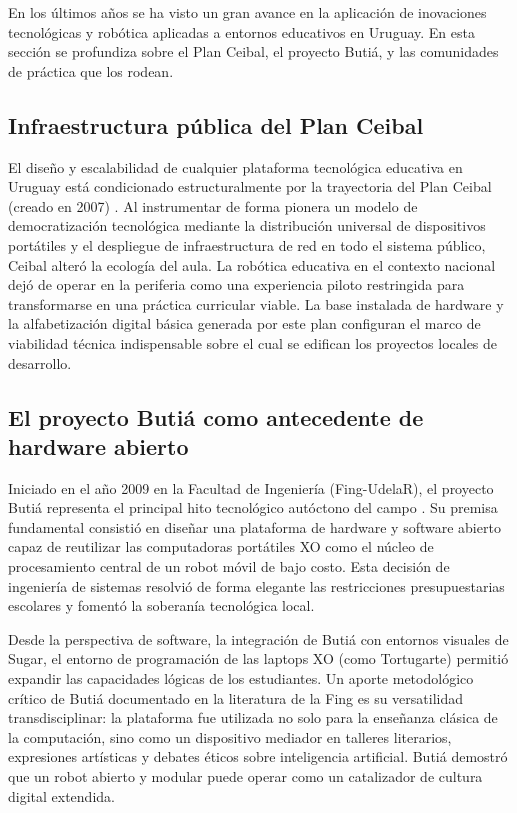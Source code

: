 \documentclass{prgrado}
\begin{document}
En los últimos años se ha visto un gran avance en la aplicación de inovaciones tecnológicas y robótica aplicadas a entornos educativos en Uruguay. En esta sección se profundiza sobre el Plan Ceibal, el proyecto Butiá, y las comunidades de práctica que los rodean.

\subsection{Infraestructura pública del Plan Ceibal}

El diseño y escalabilidad de cualquier plataforma tecnológica educativa en Uruguay está condicionado estructuralmente por la trayectoria del Plan Ceibal (creado en 2007) \cite{uruguay2007decreto144,anepNDceibal}. Al instrumentar de forma pionera un modelo de democratización tecnológica mediante la distribución universal de dispositivos portátiles y el despliegue de infraestructura de red en todo el sistema público, Ceibal alteró la ecología del aula. La robótica educativa en el contexto nacional dejó de operar en la periferia como una experiencia piloto restringida para transformarse en una práctica curricular viable. La base instalada de hardware y la alfabetización digital básica generada por este plan configuran el marco de viabilidad técnica indispensable sobre el cual se edifican los proyectos locales de desarrollo.

\subsection{El proyecto Butiá como antecedente de hardware abierto}

Iniciado en el año 2009 en la Facultad de Ingeniería (Fing-UdelaR), el proyecto Butiá representa el principal hito tecnológico autóctono del campo \cite{benavides2013butia,udelarNDbutia}. Su premisa fundamental consistió en diseñar una plataforma de hardware y software abierto capaz de reutilizar las computadoras portátiles XO como el núcleo de procesamiento central de un robot móvil de bajo costo. Esta decisión de ingeniería de sistemas resolvió de forma elegante las restricciones presupuestarias escolares y fomentó la soberanía tecnológica local.

Desde la perspectiva de software, la integración de Butiá con entornos visuales de Sugar, el entorno de programación de las laptops XO (como Tortugarte) permitió expandir las capacidades lógicas de los estudiantes. Un aporte metodológico crítico de Butiá documentado en la literatura de la Fing es su versatilidad transdisciplinar: la plataforma fue utilizada no solo para la enseñanza clásica de la computación, sino como un dispositivo mediador en talleres literarios, expresiones artísticas y debates éticos sobre inteligencia artificial. Butiá demostró que un robot abierto y modular puede operar como un catalizador de cultura digital extendida.
\end{document}

